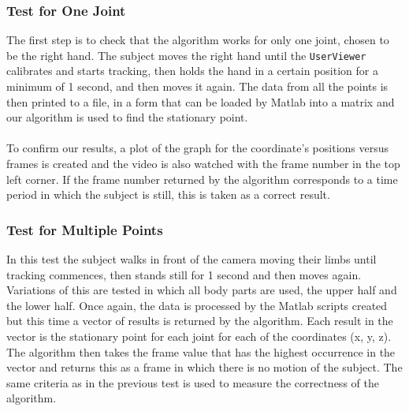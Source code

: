 \documentclass[a4paper]{article}
\begin{document}
\subsubsection{Test for One Joint}
The first step is to check that the algorithm works for only one joint, chosen to be the right hand. The subject moves the right hand until the \texttt{UserViewer} calibrates and starts tracking, then holds the hand in a certain position for a minimum of 1 second, and then moves it again. The data from all the points is then printed to a file, in a form that can be loaded by Matlab into a matrix and our algorithm is used to find the stationary point. \\\\
\noindent
To confirm our results, a plot of the graph for the coordinate's positions versus frames is created and the video is also watched with the frame number in the top left corner. If the frame number returned by the algorithm corresponds to a time period in which the subject is still, this is taken as a correct result. 
\subsubsection{Test for Multiple Points}
\noindent 
In this test the subject walks in front of the camera moving their limbs until tracking commences, then stands still for 1 second and then moves again. Variations of this are tested in which all body parts are used, the upper half and the lower half. Once again, the data is processed by the Matlab scripts created but this time a vector of results is returned by the algorithm. Each result in the vector is the stationary point for each joint for each of the coordinates (x, y, z). The algorithm then takes the frame value that has the highest occurrence in the vector and returns this as a frame in which there is no motion of the subject. The same criteria as in the previous test is used to measure the correctness of the algorithm. 
\end{document}
